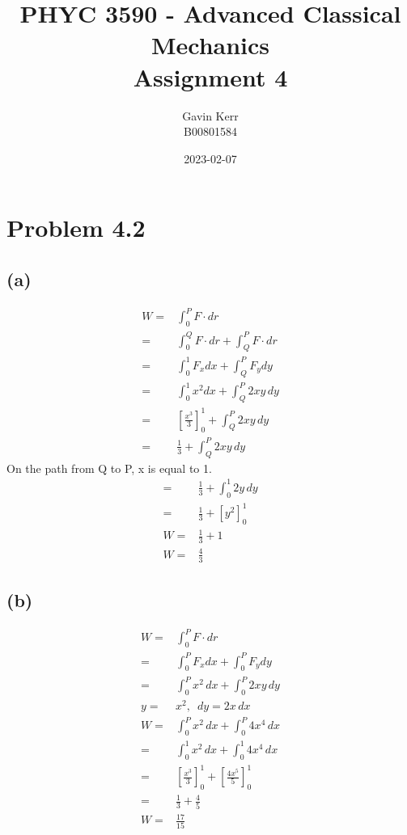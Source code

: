 \documentclass[12pt, a4paper]{article}
\title{PHYC 3590 - Advanced Classical Mechanics\\Assignment 4}
\author{Gavin Kerr\\B00801584}
\date{2023-02-07}
\begin{document}
\maketitle









\section*{Problem 4.2}
\subsection*{(a)}
\begin{align*}
W =& \int_0^P F \cdot dr
\\
=& \int_0^Q F \cdot dr + \int_Q^P F \cdot dr
\\
=& \int_0^1 F_xdx + \int_Q^P F_ydy
\\
=& \int_0^1 x^2 dx + \int_Q^P 2 xy \,dy
\\
=& \left[ \frac{x^3}{3} \right]_0^1 + \int_Q^P 2 xy \,dy
\\
=& \frac{1}{3}  + \int_Q^P 2 xy \,dy
\end{align*}
On the path from Q to P, x is equal to 1. 
\begin{align*}
=& \frac{1}{3}  + \int_0^1 2y \,dy
\\
=& \frac{1}{3}  + [y^2]_0^1
\\
W =& \frac{1}{3}  + 1 
\\
W =& \boxed{\frac{4}{3}}
\end{align*}
\subsection*{(b)}
\begin{align*}
W =& \int_0^P F \cdot dr
\\
=& \int_0^P F_x dx + \int_0^P F_y dy
\\
=& \int_0^P x^2 \, dx + \int_0^P 2xy \, dy
\\
y =& x^2, \,\,\, dy = 2x \,dx
\\
W=& \int_0^P x^2 \, dx + \int_0^P 4x^4 \, dx
\\
=& \int_0^1 x^2 \, dx + \int_0^1 4x^4 \, dx
\\
=& \left[ \frac{x^3}{3} \right]_0^1 + 
   \left[ \frac{4x^5}{5}\right]_0^1
\\
=& \frac{1}{3} + \frac{4}{5} 
\\
W =& \boxed{\frac{17}{15}}
\end{align*}
\end{document}
